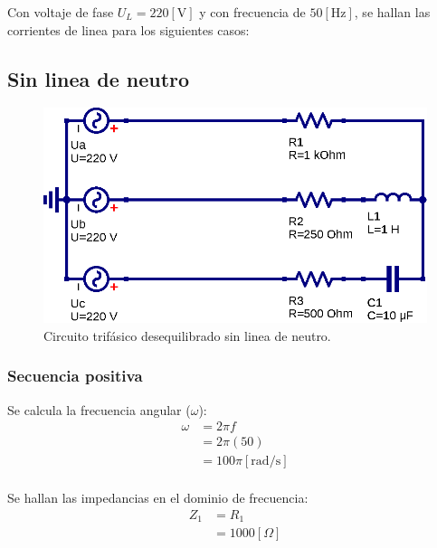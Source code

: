 \documentclass[letter,11pt]{article}
\begin{document}
Con voltaje de fase $U_L=220[\text{V}]$ y con frecuencia de $50[\text{Hz}]$,
se hallan las corrientes de linea para los siguientes casos:
\\

\subsection{Sin linea de neutro}
\begin{figure}[!h]
\centering
\includegraphics[scale=0.9]{figura1.eps}
\caption{Circuito trifásico desequilibrado sin linea de neutro.}
\label{circuito1}
\end{figure}

\subsubsection{Secuencia positiva}
Se calcula la frecuencia angular ($\omega$):
\begin{equation*}
    \begin{split}
        \omega&=2\pi f\\
              &=2\pi(50)\\
              &=100\pi[\text{rad}/\text{s}]\\
    \end{split}
\end{equation*}

Se hallan las impedancias en el dominio de frecuencia:
\begin{equation*}
    \begin{split}
        Z_1 &= R_1\\
            &= 1000[\Omega]\\
    \end{split}
\end{equation*}
\end{document}
